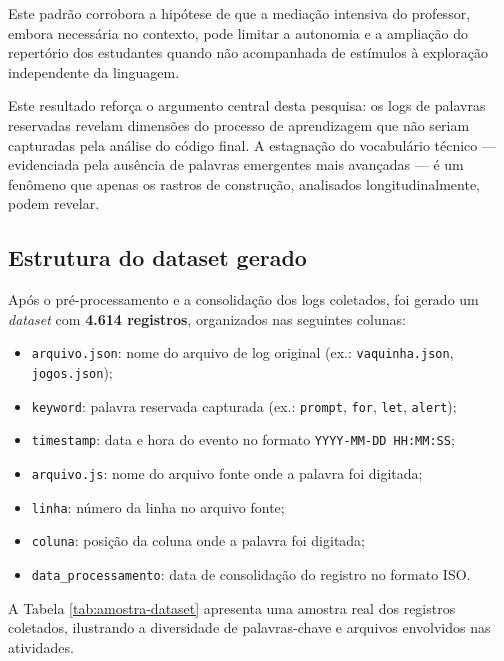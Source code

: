 Este padrão corrobora a hipótese de que a mediação intensiva do professor, embora necessária no contexto, pode limitar a autonomia e a ampliação do repertório dos estudantes quando não acompanhada de estímulos à exploração independente da linguagem.

Este resultado reforça o argumento central desta pesquisa: os logs de palavras reservadas revelam dimensões do processo de aprendizagem que não seriam capturadas pela análise do código final. A estagnação do vocabulário técnico — evidenciada pela ausência de palavras emergentes mais avançadas — é um fenômeno que apenas os rastros de construção, analisados longitudinalmente, podem revelar.

\subsection{Estrutura do dataset gerado}

Após o pré-processamento e a consolidação dos logs coletados, foi gerado um \textit{dataset} com \textbf{4.614 registros}, organizados nas seguintes colunas:

\begin{itemize}
    \item \texttt{arquivo.json}: nome do arquivo de log original (ex.: \texttt{vaquinha.json}, \texttt{jogos.json});
    \item \texttt{keyword}: palavra reservada capturada (ex.: \texttt{prompt}, \texttt{for}, \texttt{let}, \texttt{alert});
    \item \texttt{timestamp}: data e hora do evento no formato \texttt{YYYY-MM-DD HH:MM:SS};
    \item \texttt{arquivo.js}: nome do arquivo fonte onde a palavra foi digitada;
    \item \texttt{linha}: número da linha no arquivo fonte;
    \item \texttt{coluna}: posição da coluna onde a palavra foi digitada;
    \item \texttt{data\_processamento}: data de consolidação do registro no formato ISO.
\end{itemize}

A Tabela \ref{tab:amostra-dataset} apresenta uma amostra real dos registros coletados, ilustrando a diversidade de palavras-chave e arquivos envolvidos nas atividades.

